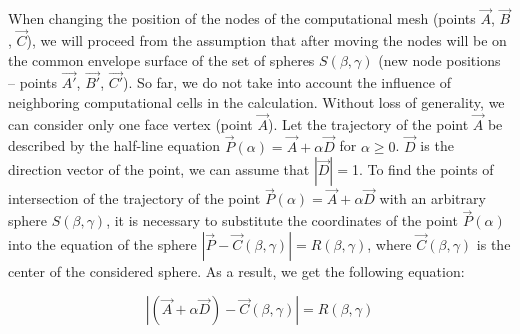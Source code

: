 \documentclass[
11pt,%
tightenlines,%
twoside,%
onecolumn,%
nofloats,%
nobibnotes,%
nofootinbib,%
superscriptaddress,%
noshowpacs,%
centertags]%
{revtex4}
\begin{document}
When changing the position of the nodes of the computational mesh (points $\vec{A}$, $\vec{B}$, $\vec{C}$), we will proceed from the assumption that after moving the nodes will be on the common envelope surface of the set of spheres $ S(\beta, \gamma)$ (new node positions -- points $\vec{A'}$, $\vec{B'}$, $\vec{C'}$).
So far, we do not take into account the influence of neighboring computational cells in the calculation.
Without loss of generality, we can consider only one face vertex (point $\vec{A}$).
Let the trajectory of the point $\vec{A}$ be described by the half-line equation $\vec{P}(\alpha) = \vec{A} + \alpha \vec{D}$ for $\alpha \ge 0$.
$\vec{D}$ is the direction vector of the point, we can assume that $|\vec{D}| = $1.
To find the points of intersection of the trajectory of the point $\vec{P}(\alpha) = \vec{A} + \alpha \vec{D}$ with an arbitrary sphere $S(\beta, \gamma)$, it is necessary to substitute the coordinates of the point $ \vec{P}(\alpha)$ into the equation of the sphere $|\vec{P} - \vec{C}(\beta, \gamma)| = R(\beta, \gamma)$, where $\vec{C}(\beta, \gamma)$ is the center of the considered sphere.
As a result, we get the following equation:

\begin{equation}\label{eqn:intersect}
|(\vec{A} + \alpha \vec{D}) - \vec{C}(\beta, \gamma)| = R(\beta, \gamma)
\end{equation}
\end{document}
